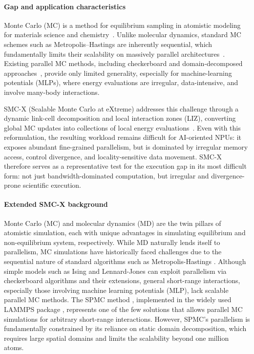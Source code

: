 \documentclass{article}
\begin{document}
\paragraph{Gap and application characteristics}
Monte Carlo (MC) is a method for equilibrium sampling in atomistic modeling for materials science and chemistry~\cite{LiuNPJ2025, doi:10.1021/acs.jctc.5c01614}. Unlike molecular dynamics, standard MC schemes such as Metropolis--Hastings are inherently sequential, which fundamentally limits their scalability on massively parallel architectures~\cite{PREIS20094468}. Existing parallel MC methods, including checkerboard and domain-decomposed approaches~\cite{PREIS20094468, 10.1145/3295500.3356149, ROMERO2020107473, mick2013gpu}, provide only limited generality, especially for machine-learning potentials (MLPs), where energy evaluations are irregular, data-intensive, and involve many-body interactions.

SMC-X (Scalable Monte Carlo at eXtreme) addresses this challenge through a dynamic link-cell decomposition and local interaction zones (LIZ), converting global MC updates into collections of local energy evaluations~\cite{LiuNPJ2025}. Even with this reformulation, the resulting workload remains difficult for AI-oriented NPUs: it exposes abundant fine-grained parallelism, but is dominated by irregular memory access, control divergence, and locality-sensitive data movement. SMC-X therefore serves as a representative test for the execution gap in its most difficult form: not just bandwidth-dominated computation, but irregular and divergence-prone scientific execution.

\paragraph{Extended SMC-X background}
Monte Carlo (MC) and molecular dynamics (MD) are the twin pillars of atomistic simulation, each with unique advantages in simulating equilibrium and non-equilibrium system, respectively. While MD naturally lends itself to parallelism, MC simulations have historically faced challenges due to the sequential nature of standard algorithms such as Metropolis-Hastings \cite{PREIS20094468}. Although simple models such as Ising \cite{PREIS20094468, 10.1145/3295500.3356149, ROMERO2020107473} and Lennard-Jones \cite{mick2013gpu} can exploit parallelism via checkerboard algorithms and their extensions, general short-range interactions, especially those involving machine learning potentials (MLP), lack scalable parallel MC methods. The SPMC method \cite{sadigh2012scalable}, implemented in the widely used LAMMPS package \cite{THOMPSON2022108171}, represents one of the few solutions that allows parallel MC simulations for arbitrary short-range interactions. However, SPMC’s parallelism is fundamentally constrained by its reliance on static domain decomposition, which requires large spatial domains and limits the scalability beyond one million atoms.
\end{document}
